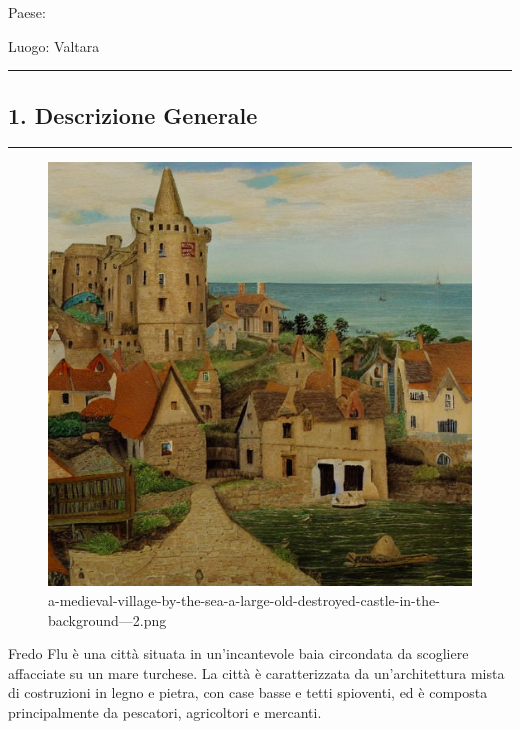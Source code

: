 Paese:

Luogo: Valtara

\begin{center}\rule{0.5\linewidth}{0.5pt}\end{center}

\subsection{1. Descrizione Generale}\label{descrizione-generale}

\begin{center}\rule{0.5\linewidth}{0.5pt}\end{center}

\begin{figure}
\centering
\includegraphics{a-medieval-village-by-the-sea-a-large-old-destroyed-castle-in-the-background---2.png}
\caption{a-medieval-village-by-the-sea-a-large-old-destroyed-castle-in-the-background---2.png}
\end{figure}

Fredo Flu è una città situata in un'incantevole baia circondata da
scogliere affacciate su un mare turchese. La città è caratterizzata da
un'architettura mista di costruzioni in legno e pietra, con case basse e
tetti spioventi, ed è composta principalmente da pescatori, agricoltori
e mercanti.

